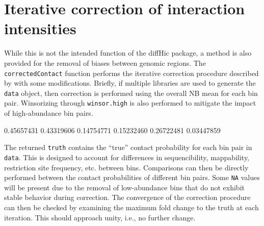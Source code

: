 \documentclass[12pt]{report}
\renewenvironment{Schunk}{\vspace{0pt}}{\vspace{0pt}}
\newcommand{\pkgname}{diffHic}
\newcommand{\code}[1]{{\small\texttt{#1}}}
\begin{document}

\section{Iterative correction of interaction intensities}
\label{sec:itercor}
While this is not the intended function of the \pkgname{} package, a method is also provided for the removal of biases between genomic regions.
The \code{correctedContact} function performs the iterative correction procedure described by \cite{imakaev2012iterative} with some modifications.
Briefly, if multiple libraries are used to generate the \code{data} object, then correction is performed using the overall NB mean for each bin pair.
Winsorizing through \code{winsor.high} is also performed to mitigate the impact of high-abundance bin pairs.

\begin{Schunk}
\begin{Soutput}
[1] 0.45657431 0.43319606 0.14754771 0.15232460 0.26722481 0.03447859
\end{Soutput}
\end{Schunk}

The returned \code{truth} contains the ``true'' contact probability for each bin pair in \code{data}.
This is designed to account for differences in sequencibility, mappability, restriction site frequency, etc. between bins.
Comparisons can then be directly performed between the contact probabilities of different bin pairs.
Some \code{NA} values will be present due to the removal of low-abundance bins that do not exhibit stable behavior during correction.
The convergence of the correction procedure can then be checked by examining the maximum fold change to the truth at each iteration.
This should approach unity, i.e., no further change.
\end{document}
